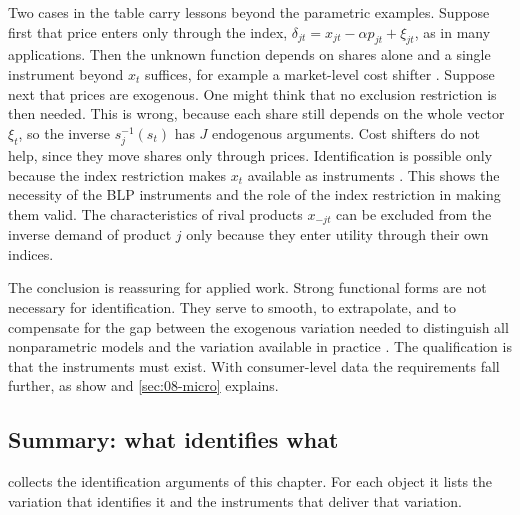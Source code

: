 Two cases in the table carry lessons beyond the parametric examples. Suppose first that price enters only
through the index, $\delta_{jt} = x_{jt} - \alpha p_{jt} + \xi_{jt}$, as in many applications. Then the
unknown function depends on shares alone and a single instrument beyond $x_t$ suffices, for example a
market-level cost shifter \citep[p.~1785]{BerryHaile2014}. Suppose next that prices are exogenous. One might
think that no exclusion restriction is then needed. This is wrong, because each share still depends on the whole
vector $\xi_t$, so the inverse $s_j^{-1}(s_t)$ has $J$ endogenous arguments. Cost shifters do not help, since they
move shares only through prices. Identification is possible only because the index restriction makes $x_t$
available as instruments \citep[pp.~1785--1786]{BerryHaile2014}. This shows the necessity of the BLP
instruments and the role of the index restriction in making them valid. The characteristics of rival products
$x_{-jt}$ can be excluded from the inverse demand of product $j$ only because they enter utility through their
own indices.

The conclusion is reassuring for applied work. Strong functional forms are not necessary for identification.
They serve to smooth, to extrapolate, and to compensate for the gap between the exogenous variation needed to
distinguish all nonparametric models and the variation available in practice \citep[p.~1786]{BerryHaile2014}.
The qualification is that the instruments must exist. With consumer-level data the requirements fall further, as
\citet{BerryHaile2024} show and \cref{sec:08-micro} explains.

\subsection{Summary: what identifies what}\label{sec:08-iv-summary}

 collects the identification arguments of this chapter. For each object it lists
the variation that identifies it and the instruments that deliver that variation.

